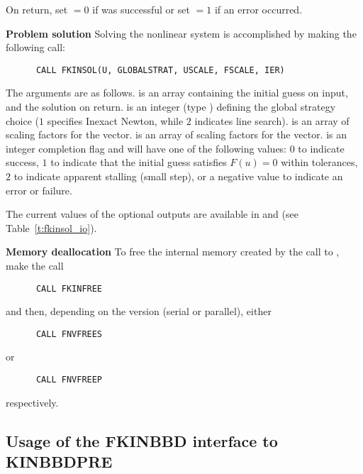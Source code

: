 \begin{Steps}
  On return, set  $= 0$ if  was successful or set  $= 1$
  if an error occurred.
  
\item {\bf Problem solution}
  Solving the nonlinear system is accomplished by making the following call:
\begin{verbatim}
      CALL FKINSOL(U, GLOBALSTRAT, USCALE, FSCALE, IER)
\end{verbatim}
  The arguments are as follows.
   is an array containing the initial guess on input, and the
  solution on return.
   is an integer (type ) defining the global strategy 
  choice ($1$ specifies Inexact Newton, while $2$ indicates line search).
   is an array of scaling factors for the  vector.
   is an array of scaling factors for the  vector.
   is an integer completion flag and will have one of the following values:
  $0$ to indicate success,
  $1$ to indicate that the initial guess satisfies $F(u) = 0$ within tolerances,
  $2$ to indicate apparent stalling (small step), or
  a negative value to indicate an error or failure.
  
  The current values of the optional outputs are available in  and
   (see Table~\ref{t:fkinsol_io}).
  
\item {\bf Memory deallocation}
  To free the internal memory created by the call to ,
  make the call
\begin{verbatim}
      CALL FKINFREE
\end{verbatim}
  and then, depending on the {\nvector} version (serial or parallel), either
\begin{verbatim}
      CALL FNVFREES
\end{verbatim}
  or
\begin{verbatim}
      CALL FNVFREEP  
\end{verbatim}
  respectively.
  
\end{Steps}


\subsection{Usage of the FKINBBD interface to KINBBDPRE}

